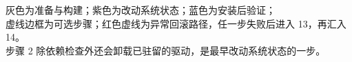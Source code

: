 \documentclass[a4paper,11pt]{article}
\begin{document}
\begin{center}

\vspace{4mm}

{\small 灰色为准备与构建；紫色为改动系统状态；蓝色为安装后验证；\\
虚线边框为可选步骤；红色虚线为异常回滚路径，任一步失败后进入 13，再汇入 14。\\
步骤 2 除依赖检查外还会卸载已驻留的驱动，是最早改动系统状态的一步。}

\end{center}
\end{document}
